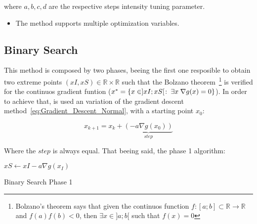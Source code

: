 where \(a, b, c, d\) are the respective steps intensity tuning parameter. \\




\begin{tcolorbox}[colback=blue!5!white,colframe=blue!35!white,title=Notes:]
\begin{itemize}
    \item The method supports multiple optimization variables.
\end{itemize}
\end{tcolorbox} 









\subsection{Binary Search}
\label{subsec:Binary_Search}

This method is composed by two phases, beeing the first one resposible to obtain two extreme points \((xI,xS) \in \mathbb{R} \times \mathbb{R}\) such that the Bolzano theorem~\footnote{Bolzano's theorem says that given the continuos function \(f:[a;b] \subset \mathbb{R} \to \mathbb{R}\) and \(f(a)f(b) < 0\), then \(\exists x \in  ]a; b[\) such that \(f(x) = 0\)} is verified for the continuos gradient funtion (\(  x^*= \{ x \in ]xI; xS[ \hspace{0.1em}  : \hspace{0.25em} \exists x \hspace{0.25em}\nabla g(x) = 0 \} \)). In order to achieve that, is used an variation of the gradient descent method~\ref{eq:Gradient_Descent_Normal}, with a starting point \(x_0\):

\begin{equation}
    x_{k+1} = x_k + \underbrace{(- a \nabla g(x_0))}_{step}
    \label{eq:Binary_Search_Phase1_gradDesc}
\end{equation}

Where the \(step\) is always equal. That beeing said, the phase 1 algorithm: 

  \begin{algorithm}
    $xS \gets xI - a \nabla g(x_I)$    
    \caption{Binary Search Phase 1} \label{alg:Binary_Search_Phase_1}
  \end{algorithm}


